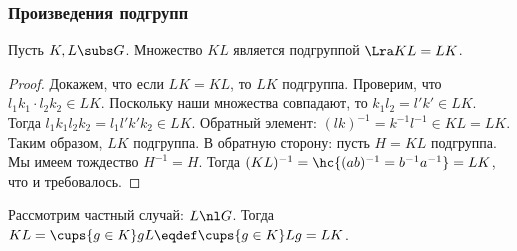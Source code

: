 \documentclass[a4paper]{article}
\begin{document}
\subsubsection{Произведения подгрупп}

\begin{stm}
Пусть $K, L \subs G$. Множество $KL$ является подгруппой $\Lra K L=L K$.
\end{stm}
\begin{proof}
Докажем, что если $L K=K L$, то $L K$ подгруппа. Проверим, что $l_1k_1 \cdot l_2k_2 \in LK$. Поскольку  наши
множества совпадают, то $k_1 l_2=l'k' \in LK$. Тогда $l_1k_1 l_2k_2 = l_1 l'k'k_2 \in LK$. Обратный элемент:
$(lk)^{-1}=k^{-1}l^{-1} \in K L = L K$. Таким образом, $L K$ подгруппа. В обратную сторону: пусть $H=KL$
подгруппа. Мы имеем тождество $H^{-1} = H$. Тогда $(KL)^{-1}=\hc{(ab)^{-1}=b^{-1}a^{-1}}=LK$, что и
требовалось.
\end{proof}

\begin{note}
Рассмотрим частный случай: $L \nl G$. Тогда $K L = \cups{g \in K}g L \eqdef \cups{g \in K} L g = L K$.
\end{note}
\end{document}
